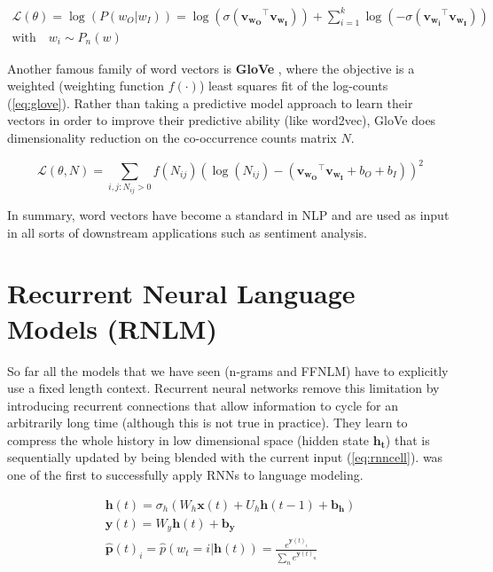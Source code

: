 \begin{equation} \label{eq:ns}
	\begin{gathered}
		\mathcal{L}(\theta) = \log(P(w_O|w_I))=\log(\sigma(\mathbf{v_{w_O}}^{\top} \mathbf{v_{w_I}})) + \sum_{i=1}^{k} \log(-\sigma(\mathbf{v_{w_i}}^{\top} \mathbf{v_{w_I}})) \\ 
		\text{with} \quad w_i \sim P_n(w)
	\end{gathered}
\end{equation}

Another famous family of word vectors is \textbf{GloVe} \cite{pennington2014glove}, where the objective is a weighted (weighting function $f(\cdot)$) least squares fit of the log-counts (\autoref{eq:glove}). Rather than taking a predictive model approach to learn their vectors in order to improve their predictive ability (like word2vec), GloVe does dimensionality reduction on the co-occurrence counts matrix $N$. 

\begin{equation} \label{eq:glove}
	\mathcal{L}(\theta, N) = \sum_{i,j:N_{ij}>0}f(N_{ij})(\log(N_{ij})-(\mathbf{v_{w_O}}^{\top} \mathbf{v_{w_I}} + b_O + b_I))^2
\end{equation}

In summary, word vectors have become a standard in NLP and are used as input in all sorts of downstream applications such as sentiment analysis.

\section{Recurrent Neural Language Models (RNLM)}
\label{sec:rnn}

So far all the models that we have seen (n-grams and FFNLM) have to explicitly use a fixed length context. Recurrent neural networks remove this limitation by introducing recurrent connections that allow information to cycle for an arbitrarily long time (although this is not true in practice). They learn to compress the whole
history in low dimensional space (hidden state $\mathbf{h_t}$) that is sequentially updated by being blended with the current input (\autoref{eq:rnncell}).   \cite{mikolov2010recurrent}  was one of the first to successfully apply RNNs to language modeling.


\begin{equation} \label{eq:rnncell}
	\begin{gathered}
		\mathbf{h}(t) = \sigma_h(W_h \mathbf{x}(t) + U_h \mathbf{h}(t-1) + \mathbf{b_h}) \\
		\mathbf{y}(t) = W_y \mathbf{h}(t) + \mathbf{b_y} \\
		\mathbf{\hat{p}}(t)_i= \hat{p}(w_t=i|\mathbf{h}(t)) = \frac{e^{\mathbf{y}(t)_i}}{\sum_{n}e^{\mathbf{y}(t)_n}} \\
	\end{gathered}
\end{equation}

